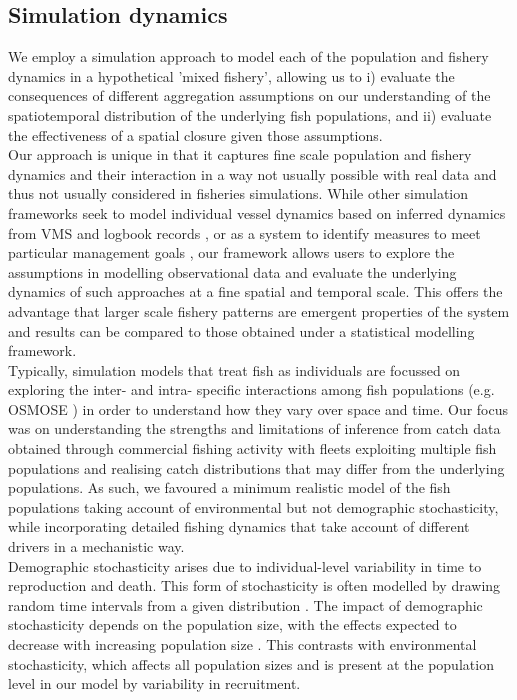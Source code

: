 \documentclass[review]{elsarticle}
\begin{document}
\subsection{Simulation dynamics}
 
We employ a simulation approach to model each of the population and fishery
dynamics in a hypothetical 'mixed fishery', allowing us to i) evaluate the
consequences of different aggregation assumptions on our understanding of the
spatiotemporal distribution of the underlying fish populations, and ii)
evaluate the effectiveness of a spatial closure given those assumptions. \\

Our approach is unique in that it captures fine scale population and fishery
dynamics and their interaction in a way not usually possible with real data and
thus not usually considered in fisheries simulations. While other simulation
frameworks seek to model individual vessel dynamics based on inferred dynamics
from VMS and logbook records \citep{Bastardie2010}, or as a system to identify
measures to meet particular management goals \citep{Bailey2018}, our framework
allows users to explore the assumptions in modelling observational data and
evaluate the underlying dynamics of such approaches at a fine spatial and
temporal scale.  This offers the advantage that larger scale fishery patterns
are emergent properties of the system and results can be compared to those
obtained under a statistical modelling framework. \\

Typically, simulation models that treat fish as individuals are focussed on
exploring the inter- and intra- specific interactions among fish populations
(e.g. OSMOSE \cite{Shin2004}) in order to understand how they vary over space
and time. Our focus was on understanding the strengths and limitations of
inference from catch data obtained through commercial fishing activity with
fleets exploiting multiple fish populations and realising catch distributions
that may differ from the underlying populations. As such, we favoured a minimum
realistic model of the fish populations \citep{Plaganyi2014} taking account of
environmental but not demographic stochasticity, while incorporating detailed
fishing dynamics that take account of different drivers in a mechanistic way.
\\ 

Demographic stochasticity arises due to individual-level variability in time to
reproduction and death. This form of stochasticity is often modelled by drawing
random time intervals from a given distribution \citep{Gillespie1977}. The
impact of demographic stochasticity depends on the population size, with the
effects expected to decrease with increasing population size \citep{Lande2010}.
This contrasts with environmental stochasticity, which affects all population
sizes and is present at the population level in our model by variability in
recruitment. \\
\end{document}
